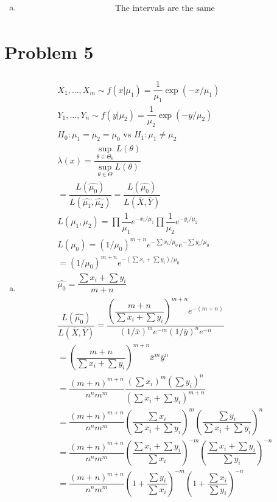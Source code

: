 \documentclass{article}
\newcommand{\lm}{\lambda}
\newcommand{\ta}{\theta}
\newcommand{\hyp}[2]{H_0: #1 \text{ vs } H_1: #2}
\begin{document}
\begin{flushleft}
\begin{enumerate}[(a)]
	\item 
\begin{multline*}\\
\text{The intervals are the same}\\
\end{multline*}

\end{enumerate}

	\section*{Problem 5}
\begin{enumerate}[(a)]
	
	\item 
\begin{multline*}\\
X_1,\dots,X_m\sim f(x|\mu_1)=\dfrac{1}{\mu_1}\exp(-x/\mu_1)\\
Y_1,\dots,Y_n\sim f(y|\mu_2)=\dfrac{1}{\mu_2}\exp(-y/\mu_2)\\
\hyp{\mu_1=\mu_2=\mu_0}{\mu_1\neq \mu_2}\\
\lm(x)=\dfrac{\sup_{\ta \in \Theta_0}L(\ta)}{\sup_{\ta \in \Theta}L(\ta)}\\
=\dfrac{L(\hat{\mu_0})}{L(\hat{\mu_1},\hat{\mu_2})}=\dfrac{L(\hat{\mu_0})}{L(\bar{X},\bar{Y})}\\
L(\mu_1,\mu_2)=\prod \dfrac{1}{\mu_1}e^{-x_i/\mu_1} \prod \dfrac{1}{\mu_2}e^{-y_i/\mu_2}\\
L(\mu_0)=(1/\mu_0)^{m+n}e^{-\sum x_i/\mu_0}e^{-\sum y_i/\mu_0}\\
=(1/\mu_0)^{m+n}e^{-(\sum x_i+\sum y_i)/\mu_0}\\
\hat{\mu_0}=\dfrac{\sum x_i+\sum y_i}{m+n}\\
\dfrac{L(\hat{\mu_0})}{L(\bar{X},\bar{Y})}=\dfrac{\left(\dfrac{m+n}{\sum x_i+\sum y_i}\right)^{m+n}e^{-(m+n)}}{(1/\bar{x})^m e^{-m}(1/\bar{y})^ne^{-n}}\\
=\left(\dfrac{m+n}{\sum x_i+\sum y_i}\right)^{m+n}\bar{x}^m \bar{y}^n\\
=\dfrac{(m+n)^{m+n}}{n^n m^m}\dfrac{(\sum x_i)^m (\sum y_i)^n}{(\sum x_i+\sum y_i)^{m+n}}\\
=\dfrac{(m+n)^{m+n}}{n^n m^m}\left(\dfrac{\sum x_i}{\sum x_i+\sum y_i}\right)^m\left(\dfrac{\sum y_i}{\sum x_i+\sum y_i}\right)^n\\
=\dfrac{(m+n)^{m+n}}{n^n m^m}\left(\dfrac{\sum x_i+\sum y_i}{\sum x_i}\right)^{-m}\left(\dfrac{\sum x_i+\sum y_i}{\sum y_i}\right)^{-n}\\
=\dfrac{(m+n)^{m+n}}{n^n m^m}\left(1+\dfrac{\sum y_i}{\sum x_i}\right)^{-m}\left(1+\dfrac{\sum x_i}{\sum y_i}\right)^{-n}\\

\end{multline*}
\end{enumerate}
\end{flushleft}
\end{document}
